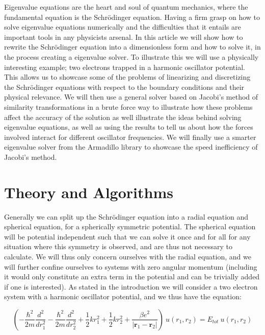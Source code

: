\documentclass[a4paper,11pt]{article}
\begin{document}
{Eigenvalue equations are the heart and soul of quantum mechanics, where the fundamental equation is the Schrödinger equation. Having a firm grasp on how to solve eigenvalue equations numerically and the difficulties that it entails are important tools in any physicists arsenal. In this article we will show how to rewrite the Schrödinger equation into a dimensionless form and how to solve it, in the process creating a eigenvalue solver. To illustrate this we will use a physically interesting example; two electrons trapped in a harmonic oscillator potential. This allows us to showcase some of the problems of linearizing and discretizing the Schrödinger equations with respect to the boundary conditions and their physical relevance. We will then use a general solver based on Jacobi's method of similarity transformations in a brute force way to illustrate how these problems affect the accuracy of the solution as well illustrate the ideas behind solving eigenvalue equations, as well as using the results to tell us about how the forces involved interact for different oscillator frequencies. We will finally use a smarter eigenvalue solver from the Armadillo library \cite{Armadillo} to showcase the speed inefficiency of Jacobi's method.
		
		
		
		
\section*{Theory and Algorithms}

Generally we can split up the Schrödinger equation into a radial equation and spherical equation, for a spherically symmetric potential. The spherical equation will be potential independent such that we can solve it once and for all for any situation where this symmetry is observed, and are thus not necessary to calculate. We will thus only concern ourselves with the radial equation, and we will further confine ourselves to systems with zero angular momentum (including it would only constitute an extra term in the potential and can be trivially added if one is interested). As stated in the introduction we will consider a two electron system with a harmonic oscillator potential, and we thus have the equation:

\begin{equation}
\left(- \frac{\hbar^2}{2m}\frac{d^2}{d r_1^2} - \frac{\hbar^2}{2m}\frac{d^2}{d r_2^2} + \frac{1}{2}k r_1^2 + \frac{1}{2}k r_2^2 + \frac{\beta e^2}{|\mathbf{r}_1 - \mathbf{r}_2|}\right) \: u(r_1,r_2) = E_{tot} \: u(r_1,r_2)
\label{schro_radial}
\end{equation} 

}
\end{document}
